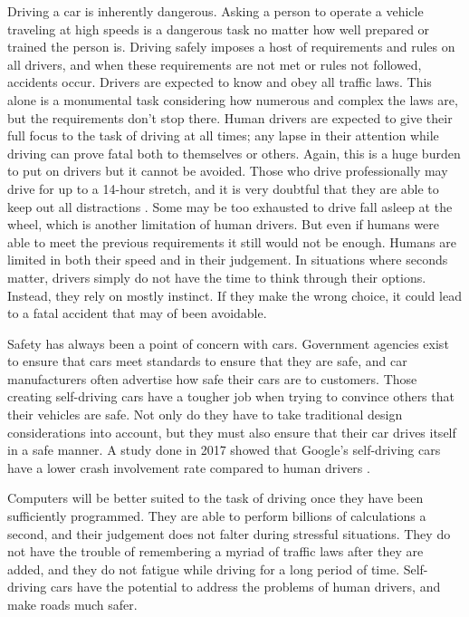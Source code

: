 \documentclass{mla}
\begin{document}
Driving a car is inherently dangerous. Asking a person to operate a vehicle traveling at high speeds is a dangerous task no matter how well prepared or trained the person is. Driving safely imposes a host of requirements and rules on all drivers, and when these requirements are not met or rules not followed, accidents occur. Drivers are expected to know and obey all traffic laws. This alone is a monumental task considering how numerous and complex the laws are, but the requirements don't stop there. Human drivers are expected to give their full focus to the task of driving at all times; any lapse in their attention while driving can prove fatal both to themselves or others. Again, this is a huge burden to put on drivers but it cannot be avoided. Those who drive professionally may drive for up to a 14-hour stretch, and it is very doubtful that they are able to keep out all distractions \cite{FMCSA2015}. Some may be too exhausted to drive fall asleep at the wheel, which is another limitation of human drivers. But even if humans were able to meet the previous requirements it still would not be enough. Humans are limited in both their speed and in their judgement. In situations where seconds matter, drivers simply do not have the time to think through their options. Instead, they rely on mostly instinct. If they make the wrong choice, it could lead to a fatal accident that may of been avoidable.

Safety has always been a point of concern with cars. Government agencies exist to ensure that cars meet standards to ensure that they are safe, and car manufacturers often advertise how safe their cars are to customers. Those creating self-driving cars have a tougher job when trying to convince others that their vehicles are safe. Not only do they have to take traditional design considerations into account, but they must also ensure that their car drives itself in a safe manner. A study done in 2017 showed that Google's self-driving cars have a lower crash involvement rate compared to human drivers \cite{Teoh2017}.

Computers will be better suited to the task of driving once they have been sufficiently programmed. They are able to perform billions of calculations a second, and their judgement does not falter during stressful situations. They do not have the trouble of remembering a myriad of traffic laws after they are added, and they do not fatigue while driving for a long period of time. Self-driving cars have the potential to address the problems of human drivers, and make roads much safer.
\end{document}
